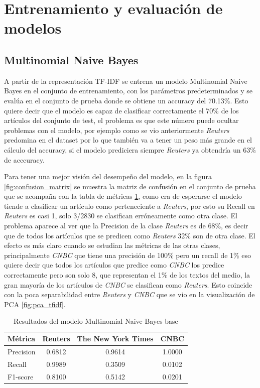 \documentclass[11pt, a4paper]{article}
\begin{document}
\section{Entrenamiento y evaluación de modelos}
\subsection{Multinomial Naive Bayes}

A partir de la representación TF-IDF se entrena un modelo Multinomial Naive Bayes
en el conjunto de entrenamiento, con los parámetros predeterminados y se evalúa 
en el conjunto de prueba donde se obtiene un accuracy del 70.13\%. Esto quiere
decir que el modelo es capaz de clasificar correctamente el 70\% de los artículos
del conjunto de test, el problema es que este número puede ocultar problemas con
el modelo, por ejemplo como se vio anteriormente \textit{Reuters} predomina en el dataset por 
lo que también va a tener un peso más grande en el cálculo del accuracy, si el modelo prediciera
siempre \textit{Reuters} ya obtendría un 63\% de acccuracy.


Para tener una mejor visión del desempeño del modelo, en la figura \ref{fig:confusion_matrix} 
se muestra la matriz de confusión en el conjunto de prueba que se acompaña con la tabla de 
métricas \ref{tab:metrics_nb}, como era de esperarse el modelo tiende a clasificar un artículo
como perteneciente a \textit{Reuters}, por esto su Recall en \textit{Reuters} es casi 1, solo 3/2830 se clasifican
erróneamente como otra clase. El problema aparece al ver que la Precision de la clase \textit{Reuters} es 
de 68\%, es decir que de todos los artículos que se predicen como \textit{Reuters} 32\% son de otra clase. 
El efecto es más claro cuando se estudian las métricas de las otras clases, principalmente \textit{CNBC} 
que tiene una precisión de 100\% pero un recall de 1\% eso quiere decir que todos los artículos 
que predice como \textit{CNBC} los predice correctamente pero son solo 8, que representan el 1\% de los 
textos del medio, la gran mayoría de los artículos de \textit{CNBC} se clasifican como \textit{Reuters}. 
Esto coincide con la poca separabilidad entre \textit{Reuters} y \textit{CNBC} que se vio en la
visualización de PCA \ref{fig:pca_tfidf}.

\begin{table}[h]
    \centering
    \begin{tabular}{lccc}
        \hline
        \textbf{Métrica} & \textbf{Reuters} & \textbf{The New York Times} & \textbf{CNBC} \\
        \hline
        Precision & 0.6812 & 0.9614 & 1.0000 \\
        Recall & 0.9989 & 0.3509 & 0.0102 \\
        F1-score & 0.8100 & 0.5142 & 0.0201 \\
        \hline
    \end{tabular}
    \caption{Resultados del modelo Multinomial Naive Bayes base}
    \label{tab:metrics_nb}
\end{table}
\end{document}
